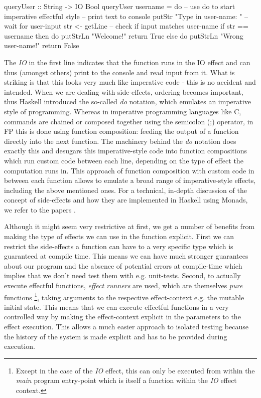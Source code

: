 \begin{HaskellCode}
queryUser :: String -> IO Bool
queryUser username = do -- use do to start imperative effectful style
  -- print text to console
  putStr "Type in user-name: "
  -- wait for user-input
  str <- getLine
  -- check if input matches user-name
  if str == username
    then do
      putStrLn "Welcome!"			
      return True
    else do
      putStrLn "Wrong user-name!"
      return False
\end{HaskellCode}

The \textit{IO} in the first line indicates that the function runs in the IO effect and can thus (amongst others) print to the console and read input from it. What is striking is that this looks very much like imperative code - this is no accident and intended. When we are dealing with side-effects, ordering becomes important, thus Haskell introduced the so-called \textit{do} notation, which emulates an imperative style of programming. Whereas in imperative programming languages like C, commands are chained or composed together using the semicolon (;) operator, in FP this is done using function composition: feeding the output of a function directly into the next function. The machinery behind the \textit{do} notation does exactly this and desugars this imperative-style code into function compositions which run custom code between each line, depending on the type of effect the computation runs in.  This approach of function composition with custom code in between each function allows to emulate a broad range of imperative-style effects, including the above mentioned ones. For a technical, in-depth discussion of the concept of side-effects and how they are implemented in Haskell using Monads, we refer to the papers \cite{moggi_computational_1989,wadler_essence_1992,wadler_monads_1995,wadler_how_1997,jones_tackling_2002}.

Although it might seem very restrictive at first, we get a number of benefits from making the type of effects we can use in the function explicit. First we can restrict the side-effects a function can have to a very specific type which is guaranteed at compile time. This means we can have much stronger guarantees about our program and the absence of potential errors at compile-time which implies that we don't need test them with e.g. unit-tests. Second, to actually execute effectful functions, \textit{effect runners} are used, which are themselves \textit{pure} functions \footnote{Except in the case of the \textit{IO} effect, this can only be executed from within the \textit{main} program entry-point which is itself a function within the \textit{IO} effect context.}, taking arguments to the respective effect-context e.g. the mutable initial state. This means that we can execute effectful functions in a very controlled way by making the effect-context explicit in the parameters to the effect execution. This allows a much easier approach to isolated testing because the history of the system is made explicit and has to be provided during execution.


